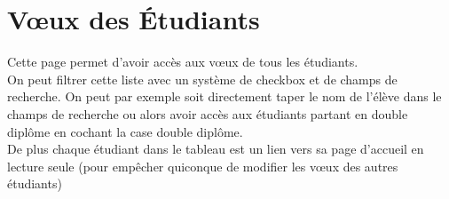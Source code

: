 \section{Vœux des Étudiants}
\label{sec::stud_wish}
Cette page permet d'avoir accès aux vœux de tous les étudiants.\\
On peut filtrer cette liste avec un système de checkbox et de champs de recherche. On peut par exemple soit directement taper le nom de l'élève dans le champs de recherche ou alors avoir accès aux étudiants partant en double diplôme en cochant la case double diplôme.\\
De plus chaque étudiant dans le tableau est un lien vers sa page d'accueil en lecture seule (pour empêcher quiconque de modifier les vœux des autres étudiants)